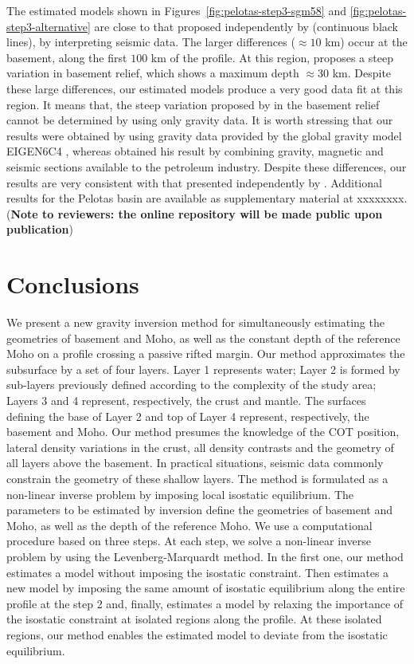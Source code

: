 \documentclass[manuscript]{geophysics}
\begin{document}
The estimated models shown in Figures~\ref{fig:pelotas-step3-sgm58} and \ref{fig:pelotas-step3-alternative} 
are close to that proposed independently by \citet{zalan2015} (continuous black lines), by
interpreting seismic data.
The larger differences ($\approx 10$ km) occur at the basement, along the first 
$100$ km of the profile.
At this region, \citeauthor{zalan2015} proposes a steep variation in basement
relief, which shows a maximum depth $\approx 30$ km. 
Despite these large differences,
our estimated models produce a very good data fit
at this region. It means that, the steep variation 
proposed by \citeauthor{zalan2015} in the basement relief cannot be determined by 
using only gravity data.
It is worth stressing that our results were obtained by using gravity data
provided by the global gravity model EIGEN6C4 \citep{forste2014}, whereas 
\citet{zalan2015} obtained his result by combining gravity, magnetic and seismic sections
available to the petroleum industry. Despite these differences, our results are very 
consistent with that presented independently by \citet{zalan2015}.
Additional results for the Pelotas basin are available as supplementary material at xxxxxxxx.
(\textbf{Note to reviewers: the online repository 
will be made public upon
publication})


\section{Conclusions}

We present a new gravity inversion method for simultaneously estimating the 
geometries of basement and Moho, as well as the constant depth of the reference Moho 
on a profile crossing a passive rifted margin.
Our method approximates the subsurface by a set of four layers. 
Layer 1 represents water; Layer 2 is formed by 
sub-layers previously defined according to the complexity of the study area; Layers 3 and 4 
represent, respectively, the crust and mantle.
The surfaces defining the base of Layer 2 and top of Layer 4 represent, respectively, 
the basement and Moho.
Our method presumes the knowledge of the COT position, lateral density variations in the crust,
all density contrasts and the geometry of all layers above the basement.
In practical situations, seismic data commonly constrain the geometry of these shallow layers.
The method is formulated as a non-linear inverse problem by imposing local
isostatic equilibrium.
The parameters to be estimated by inversion define the geometries of basement and Moho, as well as 
the depth of the reference Moho.
We use a computational procedure based on three steps.
At each step, we solve a non-linear inverse problem by using the Levenberg-Marquardt
method.
In the first one, our method estimates a model without imposing the isostatic constraint.
Then estimates a new model by imposing the same amount of isostatic equilibrium along the
entire profile at the step 2 and, finally, estimates a model by relaxing the importance of
the isostatic constraint at isolated regions along the profile.
At these isolated regions, our method enables the estimated model to deviate from the 
isostatic equilibrium.
\end{document}
